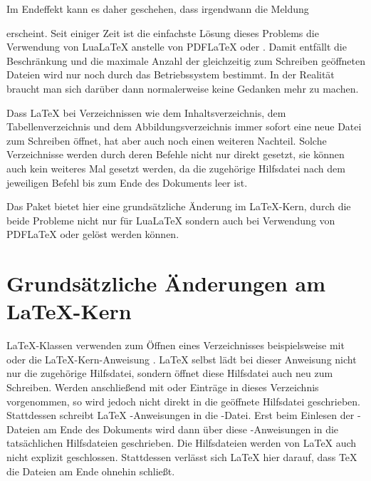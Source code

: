 Im Endeffekt kann es daher geschehen, dass irgendwann die Meldung
erscheint. Seit einiger Zeit ist die einfachste Lösung dieses Problems die
Verwendung von Lua\LaTeX{} anstelle von PDF\LaTeX{} oder \XeLaTeX. Damit
entfällt die Beschränkung und die maximale Anzahl der gleichzeitig zum
Schreiben geöffneten Dateien wird nur noch durch das Betriebssystem
bestimmt. In der Realität braucht man sich darüber dann normalerweise keine
Gedanken mehr zu machen.

Dass \LaTeX{} bei Verzeichnissen wie dem Inhaltsverzeichnis, dem
Tabellenverzeichnis und dem Abbildungsverzeichnis immer sofort eine neue Datei
zum Schreiben öffnet, hat aber auch noch einen weiteren Nachteil. Solche
Verzeichnisse werden durch deren Befehle nicht nur direkt gesetzt, sie können
auch kein weiteres Mal gesetzt werden, da die zugehörige Hilfsdatei nach dem
jeweiligen Befehl bis zum Ende des Dokuments leer ist.

Das Paket  bietet hier eine grundsätzliche Änderung im
\LaTeX-Kern, durch die beide Probleme nicht nur für Lua\LaTeX{} sondern auch bei
Verwendung von PDF\LaTeX{} oder \XeLaTeX{} gelöst werden können.


\section{Grundsätzliche Änderungen am \LaTeX-Kern}

\LaTeX-Klassen verwenden zum Öffnen eines Verzeichnisses beispielsweise mit
 oder  die \LaTeX-Kern-Anweisung
. \LaTeX{} selbst lädt bei dieser
Anweisung nicht nur die zugehörige Hilfsdatei, sondern öffnet diese Hilfsdatei
auch neu zum Schreiben. Werden anschließend mit  oder
 Einträge in dieses Verzeichnis vorgenommen, so wird
jedoch nicht direkt in die geöffnete Hilfsdatei geschrieben. Stattdessen
schreibt \LaTeX{} -Anweisungen in die
-Datei. Erst beim Einlesen der -Dateien am Ende des
Dokuments wird dann über diese -Anweisungen in die
tatsächlichen Hilfsdateien geschrieben. Die Hilfsdateien werden von \LaTeX{}
auch nicht explizit geschlossen. Stattdessen verlässt sich \LaTeX{} hier
darauf, dass \TeX{} die Dateien am Ende ohnehin schließt.

